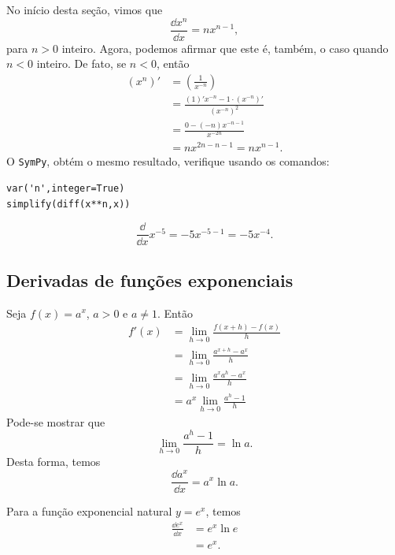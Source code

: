 \begin{obs}
  No início desta seção, vimos que
  \begin{equation}
    \frac{\dd x^n}{\dd x} = nx^{n-1},
  \end{equation}
  para $n>0$ inteiro. Agora, podemos afirmar que este é, também, o caso quando $n<0$ inteiro. De fato, se $n < 0$, então
  \begin{align}
    (x^n)' &= \left(\frac{1}{x^{-n}}\right)\\
           &= \frac{(1)'x^{-n}-1\cdot\left(x^{-n}\right)'}{\left(x^{-n}\right)^2}\\
           &= \frac{0-(-n)x^{-n-1}}{x^{-2n}}\\
           &= nx^{2n-n-1} = nx^{n-1}.
  \end{align}
  \ifispython
  O \verb+SymPy+, obtém o mesmo resultado, verifique usando os comandos:
\begin{verbatim}
var('n',integer=True)
simplify(diff(x**n,x))
\end{verbatim}
  \fi
\end{obs}

\begin{ex}
  \begin{equation}
    \frac{\dd}{\dd x}x^{-5} = -5x^{-5-1} = -5x^{-4}.
  \end{equation}
\end{ex}


\subsection{Derivadas de funções exponenciais}

Seja $f(x) = a^x$, $a>0$ e $a\neq 1$. Então
\begin{align}
  f'(x) &= \lim_{h\to 0} \frac{f(x+h)-f(x)}{h}\\
        &= \lim_{h\to 0} \frac{a^{x+h}-a^x}{h} \\
        &= \lim_{h\to 0} \frac{a^xa^h-a^x}{h} \\
        &= a^x \lim_{h\to 0} \frac{a^h-1}{h}
\end{align}
Pode-se mostrar que
\begin{equation}
  \lim_{h\to 0} \frac{a^h-1}{h} = \ln a.
\end{equation}
Desta forma, temos
\begin{equation}
  \frac{\dd a^x}{\dd x} = a^x\ln a.
\end{equation}

Para a função exponencial natural $y = e^x$, temos
\begin{align}
  \frac{\dd e^x}{\dd x} &= e^x\ln e\\
                        &= e^x.
\end{align}

